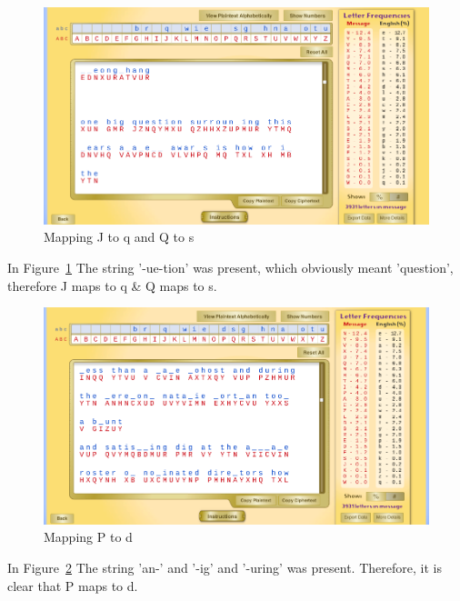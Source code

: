 \documentclass[12pt]{article}
\begin{document}
\begin{figure}[H]
    \begin{center}
        \includegraphics[scale=0.48]{c10.png}
    \end{center}{}
    \caption{Mapping J to q and Q to s}
    \label{fig:c10}
\end{figure}

In Figure~\ref{fig:c10} The string '-ue-tion' was present, which obviously meant 'question', therefore J maps to q & Q maps to s.


\begin{figure}[H]
    \begin{center}
        \includegraphics[scale=0.48]{c11.png}
    \end{center}{}
    \caption{Mapping P to d}
    \label{fig:c11}
\end{figure}

In Figure~\ref{fig:c11} The string 'an-' and '-ig' and '-uring' was present. Therefore, it is clear that P maps to d.
\end{document}
